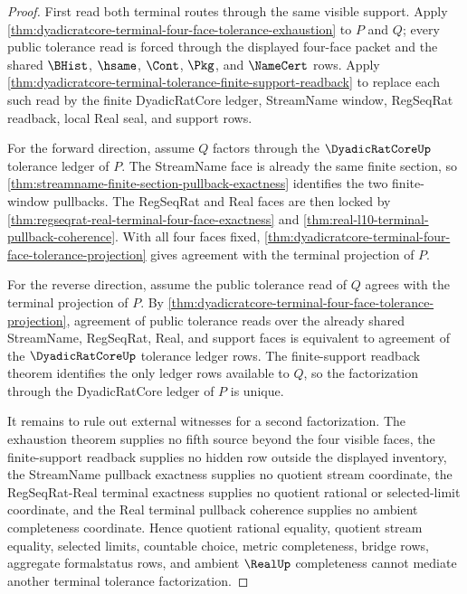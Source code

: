 \begin{proof}
First read both terminal routes through the same visible support. Apply \autoref{thm:dyadicratcore-terminal-four-face-tolerance-exhaustion} to $P$ and $Q$; every public tolerance read is forced through the displayed four-face packet and the shared $\BHist$, $\hsame$, $\Cont$, $\Pkg$, and $\NameCert$ rows. Apply \autoref{thm:dyadicratcore-terminal-tolerance-finite-support-readback} to replace each such read by the finite DyadicRatCore ledger, StreamName window, RegSeqRat readback, local Real seal, and support rows.

For the forward direction, assume $Q$ factors through the $\DyadicRatCoreUp$ tolerance ledger of $P$. The StreamName face is already the same finite section, so \autoref{thm:streamname-finite-section-pullback-exactness} identifies the two finite-window pullbacks. The RegSeqRat and Real faces are then locked by \autoref{thm:regseqrat-real-terminal-four-face-exactness} and \autoref{thm:real-l10-terminal-pullback-coherence}. With all four faces fixed, \autoref{thm:dyadicratcore-terminal-four-face-tolerance-projection} gives agreement with the terminal projection of $P$.

For the reverse direction, assume the public tolerance read of $Q$ agrees with the terminal projection of $P$. By \autoref{thm:dyadicratcore-terminal-four-face-tolerance-projection}, agreement of public tolerance reads over the already shared StreamName, RegSeqRat, Real, and support faces is equivalent to agreement of the $\DyadicRatCoreUp$ tolerance ledger rows. The finite-support readback theorem identifies the only ledger rows available to $Q$, so the factorization through the DyadicRatCore ledger of $P$ is unique.

It remains to rule out external witnesses for a second factorization. The exhaustion theorem supplies no fifth source beyond the four visible faces, the finite-support readback supplies no hidden row outside the displayed inventory, the StreamName pullback exactness supplies no quotient stream coordinate, the RegSeqRat-Real terminal exactness supplies no quotient rational or selected-limit coordinate, and the Real terminal pullback coherence supplies no ambient completeness coordinate. Hence quotient rational equality, quotient stream equality, selected limits, countable choice, metric completeness, bridge rows, aggregate formalstatus rows, and ambient $\RealUp$ completeness cannot mediate another terminal tolerance factorization.
\end{proof}

